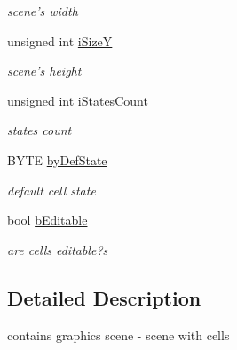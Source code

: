 \begin{DoxyCompactItemize}
\begin{DoxyCompactList}\small\item\em scene's width \item\end{DoxyCompactList}\item 
\hypertarget{classCGraphicsScene_a006f5bf1ce6017e14ce20dfd3b670f47}{
unsigned int \hyperlink{classCGraphicsScene_a006f5bf1ce6017e14ce20dfd3b670f47}{iSizeY}}
\label{classCGraphicsScene_a006f5bf1ce6017e14ce20dfd3b670f47}

\begin{DoxyCompactList}\small\item\em scene's height \item\end{DoxyCompactList}\item 
\hypertarget{classCGraphicsScene_ae2c1909ad6c669a393db40e69b1f921d}{
unsigned int \hyperlink{classCGraphicsScene_ae2c1909ad6c669a393db40e69b1f921d}{iStatesCount}}
\label{classCGraphicsScene_ae2c1909ad6c669a393db40e69b1f921d}

\begin{DoxyCompactList}\small\item\em states count \item\end{DoxyCompactList}\item 
\hypertarget{classCGraphicsScene_ad3f40fdcd54d4471c3ba5b375ad9bc4d}{
BYTE \hyperlink{classCGraphicsScene_ad3f40fdcd54d4471c3ba5b375ad9bc4d}{byDefState}}
\label{classCGraphicsScene_ad3f40fdcd54d4471c3ba5b375ad9bc4d}

\begin{DoxyCompactList}\small\item\em default cell state \item\end{DoxyCompactList}\item 
\hypertarget{classCGraphicsScene_a6fad835e2dabc95986f9b8c899998445}{
bool \hyperlink{classCGraphicsScene_a6fad835e2dabc95986f9b8c899998445}{bEditable}}
\label{classCGraphicsScene_a6fad835e2dabc95986f9b8c899998445}

\begin{DoxyCompactList}\small\item\em are cells editable?s \item\end{DoxyCompactList}\end{DoxyCompactItemize}


\subsection{Detailed Description}
contains graphics scene -\/ scene with cells 

